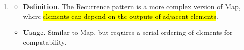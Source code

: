 \begin{enumerate}
    \item {}
    \begin{itemize}
        \item[\textcolor{Red2}{\faIcon{book}}] \textcolor{Red2}{\textbf{Definition}}. The Recurrence pattern is a more complex version of Map, where \hl{elements can depend on the outputs of adjacent elements}.

        \item[\textcolor{Green3}{\faIcon{tools}}] \textcolor{Green3}{\textbf{Usage}}. Similar to Map, but requires a serial ordering of elements for computability.
    \end{itemize}
\end{enumerate}
